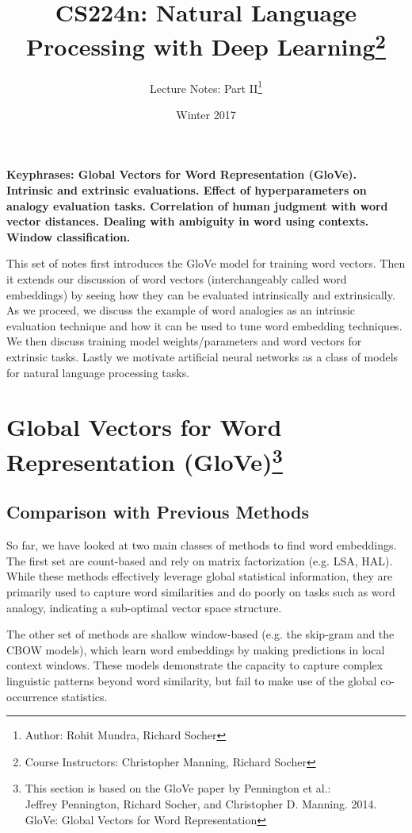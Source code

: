 \documentclass{tufte-handout}
\title{CS224n: Natural Language Processing with Deep Learning\thanks{Course Instructors: Christopher Manning, Richard Socher}}
\author[Rohit Mundra, Richard Socher]{Lecture Notes: Part II\thanks{Author: Rohit Mundra, Richard Socher}}
\date{Winter 2017} %
\begin{document}
\maketitle%



\textbf{Keyphrases: Global Vectors for Word Representation (GloVe). Intrinsic and extrinsic evaluations. Effect of hyperparameters on analogy evaluation tasks. Correlation of human judgment with word vector distances. Dealing with ambiguity in word using contexts. Window classification.}

This set of notes first introduces the GloVe model for training word vectors. Then it extends our discussion of word vectors (interchangeably called word embeddings) by seeing how they can be evaluated intrinsically and extrinsically. As we proceed, we discuss the example of word analogies as an intrinsic evaluation technique and how it can be used to tune word embedding techniques. We then discuss training model weights/parameters and word vectors for extrinsic tasks. Lastly we motivate artificial neural networks as a class of models for natural language processing tasks.

\section[GloVe]{Global Vectors for Word Representation (GloVe)\footnote{This section is based on the GloVe paper by Pennington et al.: \\ Jeffrey Pennington, Richard Socher, and Christopher D. Manning. 2014. GloVe: Global Vectors for Word Representation}}

\subsection{Comparison with Previous Methods}
So far, we have looked at two main classes of methods to find word embeddings. The first set are count-based and rely on matrix factorization (e.g. LSA, HAL). While these methods effectively leverage global statistical information, they are primarily used to capture word similarities and do poorly on tasks such as word analogy, indicating a sub-optimal vector space structure. 

The other set of methods are shallow window-based (e.g. the skip-gram and the CBOW models), which learn word embeddings by making predictions in local context windows. These models demonstrate the capacity to capture complex linguistic patterns beyond word similarity, but fail to make use of the global co-occurrence statistics.
\end{document}
